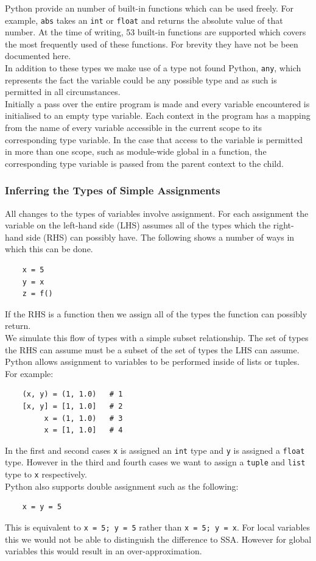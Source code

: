 \documentclass[12pt, titlepage]{article}
\begin{document}
\indent Python provide an number of built-in functions which can be used freely. For example, \texttt{abs} takes an \texttt{int} or \texttt{float} and returns the absolute value of that number. At the time of writing, 53 built-in functions are supported which covers the most frequently used of these functions. For brevity they have not be been documented here. \\
\indent In addition to these types we make use of a type not found Python, \texttt{any}, which represents the fact the variable could be any possible type and as such is permitted in all circumstances. \\
\indent Initially a pass over the entire program is made and every variable encountered is initialised to an empty type variable. Each context in the program has a mapping from the name of every variable accessible in the current scope to its corresponding type variable. In the case that access to the variable is permitted in more than one scope, such as module-wide global in a function, the corresponding type variable is passed from the parent context to the child.

\subsubsection{Inferring the Types of Simple Assignments}
All changes to the types of variables involve assignment. For each assignment the variable on the left-hand side (LHS) assumes all of the types which the right-hand side (RHS) can possibly have. The following shows a number of ways in which this can be done.
\begin{lstlisting}
	x = 5
	y = x
	z = f()
\end{lstlisting}
 If the RHS is a function then we assign all of the types the function can possibly return. \\
\indent We simulate this flow of types with a simple subset relationship. The set of types the RHS can assume must be a subset of the set of types the LHS can assume. \\
Python allows assignment to variables to be performed inside of lists or tuples. For example:
\begin{lstlisting}
    (x, y) = (1, 1.0)   # 1
    [x, y] = [1, 1.0]   # 2
         x = (1, 1.0)   # 3
         x = [1, 1.0]   # 4
\end{lstlisting}
In the first and second cases \texttt{x} is assigned an \texttt{int} type and \texttt{y} is assigned a \texttt{float} type. However in the third and fourth cases we want to assign a \texttt{tuple} and \texttt{list} type to \texttt{x} respectively. \\
Python also supports double assignment such as the following:
\begin{lstlisting}
    x = y = 5
\end{lstlisting}
This is equivalent to \texttt{x = 5; y = 5} rather than \texttt{x = 5; y = x}. For local variables this we would not be able to distinguish the difference to SSA. However for global variables this would result in an over-approximation.
\end{document}
